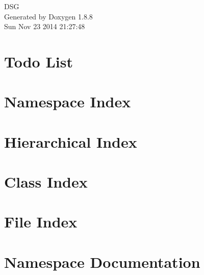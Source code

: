 \documentclass[twoside]{book}
\newcommand{\+}{\discretionary{\mbox{\scriptsize$\hookleftarrow$}}{}{}}
\newcommand{\clearemptydoublepage}{%
  \newpage{\pagestyle{empty}\cleardoublepage}%
}
\begin{document}
\hypersetup{pageanchor=false,
             bookmarks=true,
             bookmarksnumbered=true,
             pdfencoding=unicode
            }
\begin{titlepage}
\vspace*{7cm}
\begin{center}%
{\Large D\+S\+G }\\
\vspace*{1cm}
{\large Generated by Doxygen 1.8.8}\\
\vspace*{0.5cm}
{\small Sun Nov 23 2014 21:27:48}\\
\end{center}
\end{titlepage}
\clearemptydoublepage
\tableofcontents
\clearemptydoublepage
{}
\hypersetup{pageanchor=true}

\chapter{Todo List}
\label{todo}
\hypertarget{todo}{}

\chapter{Namespace Index}

\chapter{Hierarchical Index}

\chapter{Class Index}

\chapter{File Index}

\chapter{Namespace Documentation}









\end{document}
